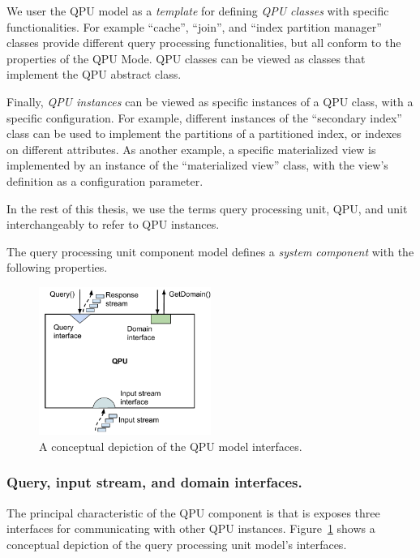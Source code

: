 We user the QPU model as a \textit{template} for defining \textit{QPU classes} with specific functionalities.
For example ``cache'', ``join'', and ``index partition manager'' classes provide different query processing functionalities,
but all conform to the properties of the QPU Mode.
QPU classes can be viewed as classes that implement the QPU abstract class.

Finally, \textit{QPU instances} can be viewed as specific instances of a QPU class,
with a specific configuration.
For example, different instances of the ``secondary index'' class can be used to
implement the partitions of a partitioned index,
or indexes on different attributes.
As another example, a specific materialized view is implemented by an instance of the
``materialized view'' class,
with the view's definition as a configuration parameter.

In the rest of this thesis, we use the terms query processing unit, QPU, and unit interchangeably to refer to QPU instances.

The query processing unit component model defines a \textit{system component} with the following properties.

\begin{figure}[H]
  \centering
    \includegraphics[width=0.5\textwidth]{./figures/design_pattern/qpu_interfaces.pdf}
  \caption{A conceptual depiction of the QPU model interfaces.}
  \label{fig:qpu_interfaces}
\end{figure}

\subsubsection{Query, input stream, and domain interfaces.}
The principal characteristic of the QPU component is that is exposes three interfaces for communicating with other QPU
instances.
Figure~\ref{fig:qpu_interfaces} shows a conceptual depiction of the query processing unit model's interfaces.

